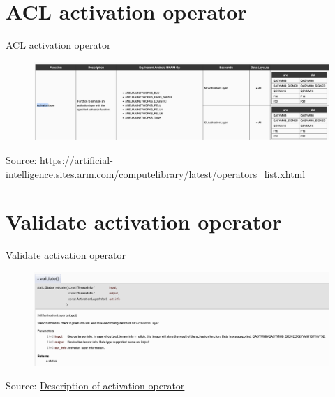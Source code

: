 \documentclass{beamer}
\begin{document}
\section{ACL activation operator}
\begin{frame}{ACL activation operator}
  \begin{figure}[h]
    \includegraphics[width=1\textwidth]{images/activation.png}
  \end{figure}
  \footnotesize Source: \href{https://artificial-intelligence.sites.arm.com/computelibrary/latest/operators_list.xhtml}{https://artificial-intelligence.sites.arm.com/computelibrary/latest/operators\_list.xhtml}
\end{frame}

\section{Validate activation operator}
\begin{frame}{Validate activation operator}
  \begin{figure}[h]
    \includegraphics[width=1\textwidth]{images/validate.png}
  \end{figure}
  \footnotesize Source: \href{https://artificial-intelligence.sites.arm.com/computelibrary/latest/classarm__compute_1_1_n_e_activation_layer.xhtml}{Description of activation operator}
\end{frame}
\end{document}
